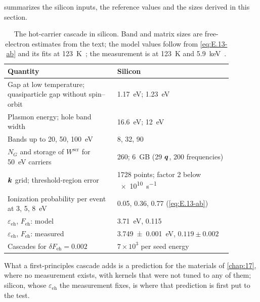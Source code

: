  summarizes the silicon inputs, the reference values and the sizes derived in this section.

\begin{table}[t]
  \caption{The hot-carrier cascade in silicon. Band and matrix sizes are free-electron estimates from the text; the model values follow from \cref{eq:E.13-ab} and its fits at \SI{123}{K}~\cite{ramanathan2020ionization}; the measurement is at \SI{123}{K} and \SI{5.9}{keV}~\cite{rodrigues2021absolute}.}
  \label{tab:E-cascade-si}
  \centering
  \begin{tabular}{p{0.43\linewidth}p{0.45\linewidth}}
    \toprule
    Quantity & Silicon \\
    \midrule
    Gap at low temperature; quasiparticle gap without spin--orbit & \SI{1.17}{eV}; \SI{1.23}{eV}~\cite{kotani2010impact} \\
    Plasmon energy; hole band width & \SI{16.6}{eV}; \SI{12}{eV}~\cite{ramanathan2020ionization} \\
    Bands up to 20, 50, \SI{100}{eV} & 8, 32, 90 \\
    $N_G$ and storage of $W^{\mathrm{scr}}$ for \SI{50}{eV} carriers & 260; \SI{6}{GB} (29 $\bm{q}$, 200 frequencies) \\
    $\bm{k}$ grid; threshold-region error & 1728 points; factor 2 below \SI{e10}{s^{-1}}~\cite{kotani2010impact} \\
    Ionization probability per event at 3, 5, \SI{8}{eV} & 0.05, 0.36, 0.77 (\cref{eq:E.13-ab}) \\
    $\varepsilon_{\mathrm{eh}}$, $F_{\mathrm{eh}}$: model & \SI{3.71}{eV}, 0.115 \\
    $\varepsilon_{\mathrm{eh}}$, $F_{\mathrm{eh}}$: measured & \SI{3.749 \pm 0.001}{eV}, $0.119 \pm 0.002$ \\
    Cascades for $\delta F_{\mathrm{eh}} = 0.002$ & $7\times10^3$ per seed energy \\
    \bottomrule
  \end{tabular}
\end{table}

What a first-principles cascade adds is a prediction for the materials of \cref{chap:17}, where no measurement exists, with kernels that were not tuned to any of them; silicon, whose $\varepsilon_{\mathrm{eh}}$ the measurement fixes, is where that prediction is first put to the test.
